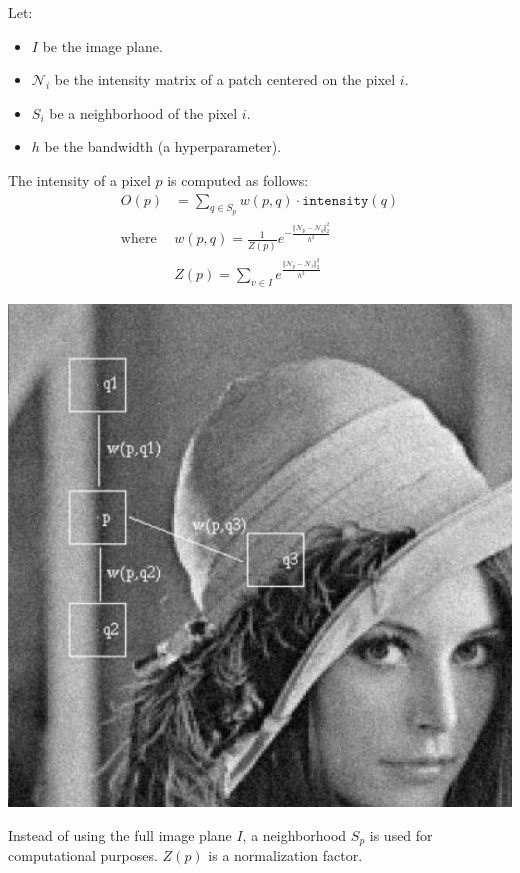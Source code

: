\begin{description}
        \begin{minipage}{0.75\textwidth}
            Let:
            \begin{itemize}
                \item $I$ be the image plane.
                \item $\mathcal{N}_i$ be the intensity matrix of a patch centered on the pixel $i$.
                \item $S_i$ be a neighborhood of the pixel $i$.
                \item $h$ be the bandwidth (a hyperparameter).
            \end{itemize}
            The intensity of a pixel $p$ is computed as follows:
            \[
                \begin{split}
                    O(p) &= \sum_{q \in S_p} w(p, q) \cdot \texttt{intensity}(q) \\
                    \text{where }& w(p, q) = \frac{1}{Z(p)} e^{-\frac{\Vert \mathcal{N}_p - \mathcal{N}_q \Vert_2^2}{h^2}} \\
                                & Z(p) = \sum_{v \in I} e^{\frac{\Vert \mathcal{N}_p - \mathcal{N}_v \Vert_2^2}{h^2}}
                \end{split}
            \]
        \end{minipage}
        \begin{minipage}{0.25\textwidth}
            \centering
            \includegraphics[width=\linewidth]{./img/non_local_means_filter.png}
        \end{minipage}

        Instead of using the full image plane $I$, a neighborhood $S_p$ is used for computational purposes.
        $Z(p)$ is a normalization factor.
\end{description}